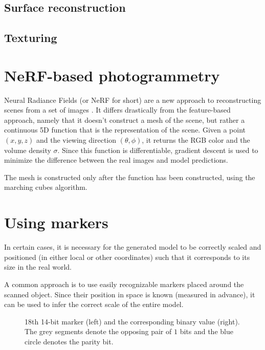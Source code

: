 \subsection{Surface reconstruction}

\subsection{Texturing}

\section{NeRF-based photogrammetry}
Neural Radiance Fields (or NeRF for short) are a new approach to reconstructing scenes from a set of images \cite{mildenhall2020nerf}.
It differs drastically from the feature-based approach, namely that it doesn't construct a mesh of the scene, but rather a continuous 5D function that is the representation of the scene.
Given a point $(x, y, z)$ and the viewing direction $(\theta, \phi)$, it returns the RGB color and the volume density $\sigma$.
Since this function is differentiable, gradient descent is used to minimize the difference between the real images and model predictions.

The mesh is constructed only after the function has been constructed, using the marching cubes algorithm.


\section{Using markers}
In certain cases, it is necessary for the generated model to be correctly scaled and positioned (in either local or other coordinates) such that it corresponds to its size in the real world.

A common approach is to use easily recognizable markers placed around the scanned object.
Since their position in space is known (measured in advance), it can be used to infer the correct scale of the entire model.

\begin{figure}
\centering
	
	\caption{18th 14-bit marker (left) and the corresponding binary value (right). The grey segments denote the opposing pair of $1$ bits and the blue circle denotes the parity bit.}
\end{figure}

